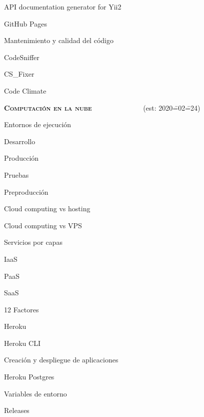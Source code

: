 \begin{longenum}
\begin{longenum}
\begin{longenum}
            \item API documentation generator for Yii2
            \item GitHub Pages
        \end{longenum}
        \item Mantenimiento y calidad del código
        \begin{longenum}
            \item CodeSniffer
            \item CS\_Fixer
            \item Code Climate
        \end{longenum}
    \end{longenum}
    \item \textbf{\textsc{Computación en la nube}} \ \ \ \ \ \ \ \ \ \ \ \ \ \ (est: 2020\==02\==24)
    \begin{longenum}
        \item Entornos de ejecución
        \begin{longenum}
            \item Desarrollo
            \item Producción
            \item Pruebas
            \item Preproducción
        \end{longenum}
        \item Cloud computing vs hosting
        \item Cloud computing vs VPS
        \item Servicios por capas
        \begin{longenum}
            \item IaaS
            \item PaaS
            \item SaaS
        \end{longenum}
        \item 12 Factores
        \item Heroku
        \begin{longenum}
            \item Heroku CLI
            \item Creación y despliegue de aplicaciones
            \item Heroku Postgres
            \item Variables de entorno
            \item Releases

\end{longenum}
\end{longenum}
\end{longenum}
